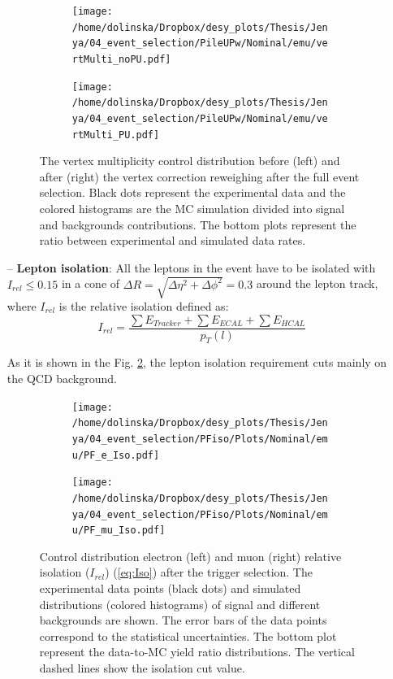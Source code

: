 \begin{itemize}
 \begin{figure}[h]
 \centering
 \begin{subfigure}
   \centering
   \texttt{[image: /home/dolinska/Dropbox/desy\_plots/Thesis/Jenya/04\_event\_selection/PileUPw/Nominal/emu/vertMulti\_noPU.pdf]}
 \end{subfigure}
 \begin{subfigure}
   \centering
   \texttt{[image: /home/dolinska/Dropbox/desy\_plots/Thesis/Jenya/04\_event\_selection/PileUPw/Nominal/emu/vertMulti\_PU.pdf]}
 \end{subfigure}
 \caption{The vertex multiplicity control distribution before (left) and after (right) the vertex correction reweighing after the full event selection.
 Black dots represent the experimental data and the colored histograms are the MC simulation divided into signal and backgrounds contributions.
 The bottom plots represent the ratio between experimental and simulated data rates.}
 \label{fig:PUweight}
 \end{figure}
 
 \item [--] \textbf{Lepton isolation}: All the leptons in the event have to be isolated with $I_{rel}\leq 0.15$ in a cone of $\Delta R = \sqrt{\Delta\eta^{2} + \Delta\phi^{2}} = 0.3$ 
 around the lepton track, where $I_{rel}$ is the relative isolation defined as:
  \begin{equation}\label{eq:Iso}
   I_{rel} = \frac{\sum E_{Tracker} + \sum E_{ECAL} + \sum E_{HCAL}}{p_{T}(l)}
  \end{equation}
 
 As it is shown in the Fig. \ref{fig:PFIso}, the lepton isolation requirement cuts mainly on the QCD background.

 \begin{figure}[h]
 \centering
 \begin{subfigure}
   \centering
   \texttt{[image: /home/dolinska/Dropbox/desy\_plots/Thesis/Jenya/04\_event\_selection/PFiso/Plots/Nominal/emu/PF\_e\_Iso.pdf]}
 \end{subfigure}
 \begin{subfigure}
   \centering
   \texttt{[image: /home/dolinska/Dropbox/desy\_plots/Thesis/Jenya/04\_event\_selection/PFiso/Plots/Nominal/emu/PF\_mu\_Iso.pdf]}
 \end{subfigure}
 \caption{Control distribution electron (left) and muon (right) relative isolation ($I_{rel}$) (\ref{eq:Iso}) after the trigger selection. The experimental data points (black dots)
  and simulated distributions (colored histograms) of signal and different backgrounds are shown. The error bars of the data points
  correspond to the statistical uncertainties. The bottom plot represent the data-to-MC yield ratio distributions. The vertical dashed lines show the isolation cut value.}
 \label{fig:PFIso}
 \end{figure}
 

\end{itemize}
